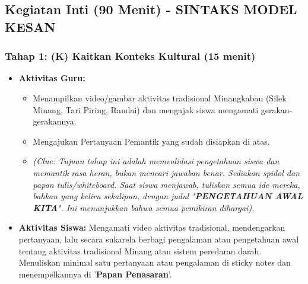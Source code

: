 \documentclass[a4paper,12pt]{article}
\begin{document}
\subsection{Kegiatan Inti (90 Menit) - SINTAKS MODEL KESAN}

\subsubsection{Tahap 1: (K) Kaitkan Konteks Kultural (15 menit)}
\begin{itemize}
\item \textbf{Aktivitas Guru:}
    \begin{itemize}
    \item Menampilkan video/gambar aktivitas tradisional Minangkabau (Silek Minang, Tari Piring, Randai) dan mengajak siswa mengamati gerakan-gerakannya.
    \item Mengajukan Pertanyaan Pemantik yang sudah disiapkan di atas.
    \item \textit{(Clue: Tujuan tahap ini adalah memvalidasi pengetahuan siswa dan memantik rasa heran, bukan mencari jawaban benar. Sediakan spidol dan papan tulis/whiteboard. Saat siswa menjawab, tuliskan semua ide mereka, bahkan yang keliru sekalipun, dengan judul "\textbf{PENGETAHUAN AWAL KITA}". Ini menunjukkan bahwa semua pemikiran dihargai).}
    \end{itemize}
\item \textbf{Aktivitas Siswa:} Mengamati video aktivitas tradisional, mendengarkan pertanyaan, lalu secara sukarela berbagi pengalaman atau pengetahuan awal tentang aktivitas tradisional Minang atau sistem peredaran darah. Menuliskan minimal satu pertanyaan atau pengalaman di sticky notes dan menempelkannya di '\textbf{Papan Penasaran}'.
\end{itemize}
\end{document}
